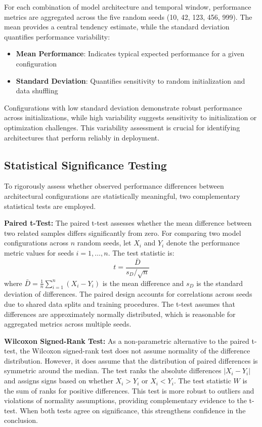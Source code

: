 For each combination of model architecture and temporal window, performance metrics are aggregated across the five random seeds (10, 42, 123, 456, 999). The mean provides a central tendency estimate, while the standard deviation quantifies performance variability:

\begin{itemize}
    \item \textbf{Mean Performance}: Indicates typical expected performance for a given configuration
    \item \textbf{Standard Deviation}: Quantifies sensitivity to random initialization and data shuffling
\end{itemize}

Configurations with low standard deviation demonstrate robust performance across initializations, while high variability suggests sensitivity to initialization or optimization challenges. This variability assessment is crucial for identifying architectures that perform reliably in deployment.

\subsection{Statistical Significance Testing}
\label{sec:statistical_testing}

To rigorously assess whether observed performance differences between architectural configurations are statistically meaningful, two complementary statistical tests are employed.

\textbf{Paired t-Test:} The paired t-test assesses whether the mean difference between two related samples differs significantly from zero. For comparing two model configurations across $n$ random seeds, let $X_i$ and $Y_i$ denote the performance metric values for seeds $i = 1, \ldots, n$. The test statistic is:
\begin{equation}
t = \frac{\bar{D}}{s_D / \sqrt{n}}
\end{equation}
where $\bar{D} = \frac{1}{n}\sum_{i=1}^{n}(X_i - Y_i)$ is the mean difference and $s_D$ is the standard deviation of differences. The paired design accounts for correlations across seeds due to shared data splits and training procedures. The t-test assumes that differences are approximately normally distributed, which is reasonable for aggregated metrics across multiple seeds.

\textbf{Wilcoxon Signed-Rank Test:} As a non-parametric alternative to the paired t-test, the Wilcoxon signed-rank test does not assume normality of the difference distribution. However, it does assume that the distribution of paired differences is symmetric around the median. The test ranks the absolute differences $|X_i - Y_i|$ and assigns signs based on whether $X_i > Y_i$ or $X_i < Y_i$. The test statistic $W$ is the sum of ranks for positive differences. This test is more robust to outliers and violations of normality assumptions, providing complementary evidence to the t-test. When both tests agree on significance, this strengthens confidence in the conclusion.

